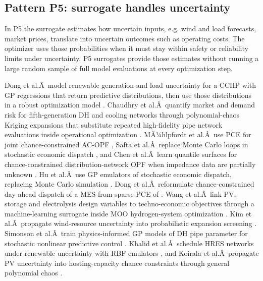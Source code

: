 \subsection{Pattern P5: surrogate handles uncertainty}
\label{sec:int:uncertainty}

In P5 the surrogate estimates how uncertain inputs, e.g. wind and load
forecasts, market prices, translate into uncertain outcomes such as
operating costs. The optimizer uses those probabilities when it must
stay within safety or reliability limits under uncertainty. P5
surrogates provide those estimates without running a large random sample
of full model evaluations at every optimization step.

Dong et al.Â~model renewable generation and load uncertainty for a CCHP
with GP regressions that return predictive distributions, then use those
distributions in a robust optimization model \cite{Dong2022}. Chaudhry et
al.Â~quantify market and demand risk for fifth-generation DH and cooling
networks through polynomial-chaos Kriging expansions that substitute
repeated high-fidelity pipe network evaluations inside operational
optimization \cite{Chaudhry2024}. MÃ¼hlpfordt et al.Â~use PCE for joint
chance-constrained AC-OPF \cite{Muhlpfordt20194806}, Safta et al.Â~replace
Monte Carlo loops in stochastic economic dispatch \cite{Safta20172535}, and
Chen et al.Â~learn quantile surfaces for chance-constrained
distribution-network OPF when impedance data are partially unknown
\cite{Chen2023657}. Hu et al.Â~use GP emulators of stochastic economic
dispatch, replacing Monte Carlo simulation \cite{Hu2020,Hu2021671}. Dong
et al.Â~reformulate chance-constrained day-ahead dispatch of a MES from
sparse PCE of \cite{Dong2023}. Wang et al.Â~link PV, storage and electrolysis
design variables to techno-economic objectives through a
machine-learning surrogate inside MOO hydrogen-system optimization
\cite{Wang2024}. Kim et al.Â~propagate wind-resource uncertainty into
probabilistic expansion screening \cite{Kim2021}. Simonson et al.Â~train
physics-informed GP models of DH pipe parameter for stochastic nonlinear
predictive control \cite{Simonson202036}. Khalid et al.Â~schedule HRES
networks under renewable uncertainty with RBF emulators
\cite{Khalid20241959}, and Koirala et al.Â~propagate PV uncertainty into
hosting-capacity chance constraints through general polynomial chaos
\cite{Koirala20242284}.
